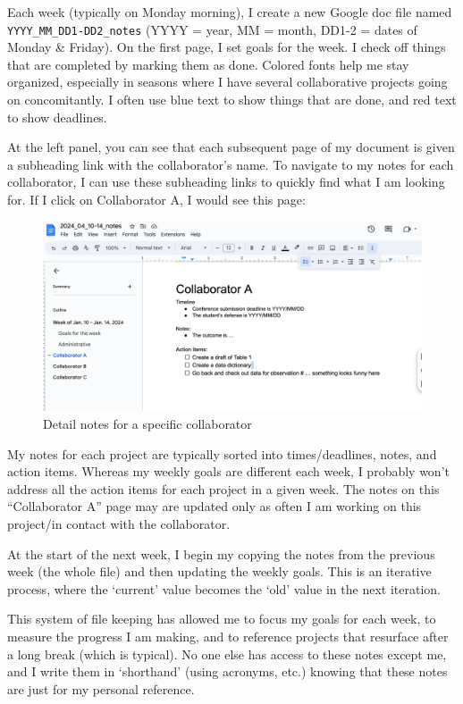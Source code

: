\documentclass[
]{book}
\begin{document}
Each week (typically on Monday morning), I create a new Google doc file named \texttt{YYYY\_MM\_DD1-DD2\_notes} (YYYY = year, MM = month, DD1-2 = dates of Monday \& Friday). On the first page, I set goals for the week. I check off things that are completed by marking them as done. Colored fonts help me stay organized, especially in seasons where I have several collaborative projects going on concomitantly. I often use blue text to show things that are done, and red text to show deadlines.

At the left panel, you can see that each subsequent page of my document is given a subheading link with the collaborator's name. To navigate to my notes for each collaborator, I can use these subheading links to quickly find what I am looking for. If I click on Collaborator A, I would see this page:

\begin{figure}
\centering
\includegraphics{img/weekly_notes2.png}
\caption{Detail notes for a specific collaborator}
\end{figure}

My notes for each project are typically sorted into times/deadlines, notes, and action items. Whereas my weekly goals are different each week, I probably won't address all the action items for each project in a given week. The notes on this ``Collaborator A'' page may are updated only as often I am working on this project/in contact with the collaborator.

At the start of the next week, I begin my copying the notes from the previous week (the whole file) and then updating the weekly goals. This is an iterative process, where the `current' value becomes the `old' value in the next iteration.

This system of file keeping has allowed me to focus my goals for each week, to measure the progress I am making, and to reference projects that resurface after a long break (which is typical). No one else has access to these notes except me, and I write them in `shorthand' (using acronyms, etc.) knowing that these notes are just for my personal reference.
\end{document}
